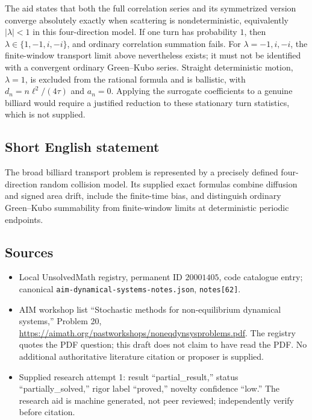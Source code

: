 \documentclass[11pt]{article}
\begin{document}
The aid states that both the full correlation series and its symmetrized version converge absolutely exactly when scattering is nondeterministic, equivalently \(|\lambda|<1\) in this four-direction model. If one turn has probability \(1\), then \(\lambda\in\{1,-1,i,-i\}\), and ordinary correlation summation fails. For \(\lambda=-1,i,-i\), the finite-window transport limit above nevertheless exists; it must not be identified with a convergent ordinary Green--Kubo series. Straight deterministic motion, \(\lambda=1\), is excluded from the rational formula and is ballistic, with \(d_n=n\ell^2/(4\tau)\) and \(a_n=0\). Applying the surrogate coefficients to a genuine billiard would require a justified reduction to these stationary turn statistics, which is not supplied.
\subsection{Short English statement}
The broad billiard transport problem is represented by a precisely defined four-direction random collision model. Its supplied exact formulas combine diffusion and signed area drift, include the finite-time bias, and distinguish ordinary Green--Kubo summability from finite-window limits at deterministic periodic endpoints.
\subsection{Sources}
\begin{itemize}
\item Local UnsolvedMath registry, permanent ID \(20001405\), code catalogue entry; canonical \texttt{aim-dynamical-systems-notes.json}, \texttt{notes[62]}.
\item AIM workshop list ``Stochastic methods for non-equilibrium dynamical systems,'' Problem 20, \url{https://aimath.org/pastworkshops/noneqdynsysproblems.pdf}. The registry quotes the PDF question; this draft does not claim to have read the PDF. No additional authoritative literature citation or proposer is supplied.
\item Supplied research attempt 1: result ``partial\_result,'' status ``partially\_solved,'' rigor label ``proved,'' novelty confidence ``low.'' The research aid is machine generated, not peer reviewed; independently verify before citation.
\end{itemize}
\end{document}
